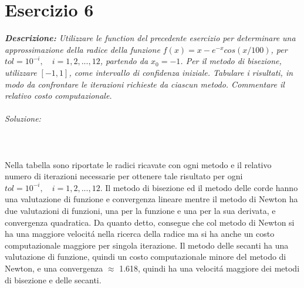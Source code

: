 \section{Esercizio 6}

\textit{\textbf{Descrizione:} Utilizzare le function del precedente esercizio per determinare una approssimazione della radice della funzione
$f(x) = x - e^{-x}cos(x/100)$,  per $tol = 10^{-i}, \quad i=1, 2,...,12$, partendo da $x_{0} = -1$. Per il metodo di bisezione,
utilizzare $[-1, 1]$, come intervallo di confidenza iniziale. Tabulare i risultati, in modo da confrontare le iterazioni richieste da ciascun metodo. Commentare il relativo costo computazionale.}\\~\\
\emph{Soluzione: }\\~\\

\\~\\
Nella tabella sono riportate le radici ricavate con ogni metodo e il relativo numero di iterazioni necessarie per ottenere tale risultato per ogni $tol = 10^{-i}, \quad i=1, 2,...,12$.\newline
Il metodo di bisezione ed il metodo delle corde hanno una valutazione di funzione e convergenza lineare mentre il metodo di Newton ha due valutazioni di funzioni, una per la funzione e una per la sua derivata, e convergenza quadratica. Da quanto detto, consegue che col metodo di Newton si ha una maggiore velocit\'a nella ricerca della radice ma si ha anche un costo computazionale maggiore per singola iterazione. Il metodo delle secanti ha una valutazione di funzione, quindi un costo computazionale minore del metodo di Newton,  e una convergenza $\approx$ 1.618, quindi ha una velocit\'a maggiore dei metodi di bisezione e delle secanti.